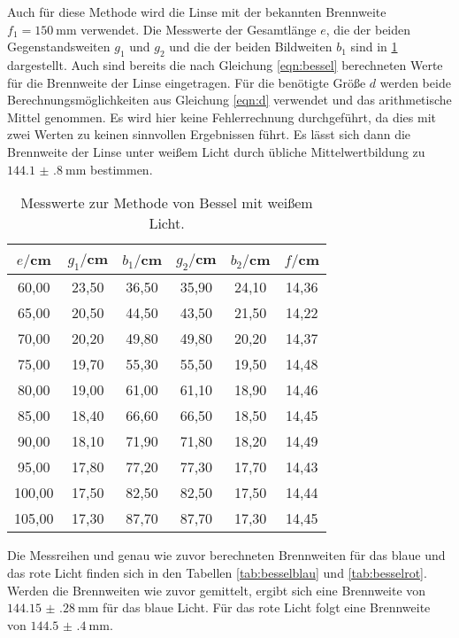 Auch für diese Methode wird die Linse mit der bekannten Brennweite $f_1 = \SI{150}{\milli\meter}$
verwendet. Die Messwerte der Gesamtlänge $e$, die der beiden Gegenstandsweiten $g_1$ und $g_2$
und die der beiden Bildweiten $b_1$ sind in \ref{tab:bessel} dargestellt. Auch sind
bereits die nach Gleichung \eqref{eqn:bessel} berechneten Werte für die Brennweite
der Linse eingetragen. Für die benötigte Größe $d$ werden beide Berechnungsmöglichkeiten
aus Gleichung \eqref{eqn:d} verwendet und das arithmetische Mittel genommen. Es wird hier keine
Fehlerrechnung durchgeführt, da dies mit zwei Werten zu keinen sinnvollen Ergebnissen
führt. Es lässt sich dann die Brennweite der Linse unter weißem Licht durch
übliche Mittelwertbildung zu $\SI{144.1(8)}{\milli\meter}$ bestimmen.

\begin{table}[htp]
	\begin{center}
    \caption{Messwerte zur Methode von Bessel mit weißem Licht.}
    \label{tab:bessel}
		\begin{tabular}{cccccc}
		\toprule
			{$e/$cm} & {$g_1/$cm} & {$b_1/$cm} & {$g_2/$cm} & {$b_2/$cm} & {$f/$cm}\\
			\midrule
			60,00 & 23,50 & 36,50 & 35,90 & 24,10 & 14,36\\
			65,00 & 20,50 & 44,50 & 43,50 & 21,50 & 14,22\\
			70,00 & 20,20 & 49,80 & 49,80 & 20,20 & 14,37\\
			75,00 & 19,70 & 55,30 & 55,50 & 19,50 & 14,48\\
			80,00 & 19,00 & 61,00 & 61,10 & 18,90 & 14,46\\
			85,00 & 18,40 & 66,60 & 66,50 & 18,50 & 14,45\\
			90,00 & 18,10 & 71,90 & 71,80 & 18,20 & 14,49\\
			95,00 & 17,80 & 77,20 & 77,30 & 17,70 & 14,43\\
			100,00 & 17,50 & 82,50 & 82,50 & 17,50 & 14,44\\
			105,00 & 17,30 & 87,70 & 87,70 & 17,30 & 14,45\\
		\bottomrule
		\end{tabular}
	\end{center}
\end{table}

Die Messreihen und genau wie zuvor berechneten Brennweiten für das blaue und das
rote Licht finden sich in den Tabellen \ref{tab:besselblau} und \ref{tab:besselrot}.
Werden die Brennweiten wie zuvor gemittelt,
ergibt sich eine Brennweite von $\SI{144.15(28)}{\milli\meter}$ für das blaue Licht.
Für das rote Licht folgt eine Brennweite von $\SI{144.5(4)}{\milli\meter}$.

